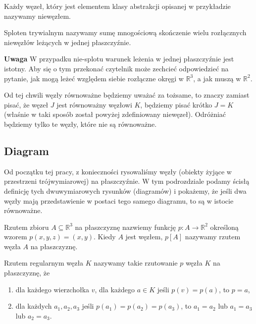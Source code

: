 \begin{definicja}
 Każdy węzeł, który jest elementem klasy abstrakcji opisanej w przykładzie nazywamy niewęzłem.
\end{definicja}
\begin{definicja}
 Sploten trywialnym nazywamy sumę mnogościową skończenie wielu rozłącznych niewęzłów leżących w jednej płaszczyźnie.
\end{definicja}

\textbf{Uwaga} W przypadku nie-splotu warunek leżenia w jednej płaszczyźnie jest istotny. Aby się o tym przekonać czytelnik może zechcieć odpowiedzieć na pytanie, 
jak mogą leżeć względem siebie rozłączne okręgi w $\mathbb{R}^3$, a jak muszą w $\mathbb{R}^2$.

Od tej chwili węzły równoważne będziemy uważać za tożsame, to znaczy zamiast pisać, że węzeł $J$ jest równoważny węzłowi $K$, będziemy pisać krótko $J=K$ (właśnie w taki sposób
został powyżej zdefiniowany niewęzeł).
Odróżniać będziemy tylko te węzły, które nie są równoważne. 

\subsection{Diagram}
Od początku tej pracy, z konieczności rysowaliśmy węzły (obiekty żyjące w przestrzeni trójwymiarowej) na płaszczyźnie. 
W tym podrozdziale podamy ścisłą definicję tych dwuwymiarowych rysunków (diagramów) i pokażemy, że jeśli dwa węzły mają przedstawienie w postaci tego samego diagramu, 
to są w istocie równoważne.

\begin{definicja}
 Rzutem zbioru $A\subseteq\mathbb{R}^3$ na płaszczyznę nazwiemy funkcję $p\colon A\to\mathbb{R}^2$ określoną wzorem $p(x,y,z) = (x,y)$. Kiedy $A$ jest węzłem, $p[A]$ nazywamy 
 rzutem węzła $A$ na płaszczyznę.
\end{definicja}


\begin{definicja}
\label{rzut_reg}
 Rzutem regularnym węzła $K$ nazywamy takie rzutowanie $p$ węzła $K$ na płaszczyznę, że
 \begin{enumerate}
  \item dla każdego wierzchołka $v$, dla każdego $a\in K$ jeśli $p(v) = p(a)$, to $p=a$,
  \item dla każdych $a_1, a_2, a_3$ jeśli $p(a_1)=p(a_2)=p(a_3)$, to $a_1=a_2$ lub $a_1=a_3$ lub $a_2=a_3$.
 \end{enumerate}
\end{definicja}

